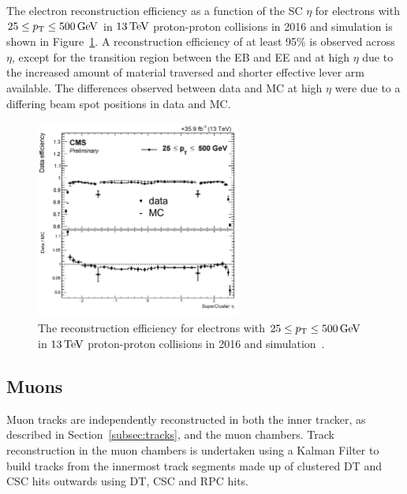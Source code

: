 The electron reconstruction efficiency as a function of the SC $\eta$ for electrons with $25 \leq p_{\mathrm{T}} \leq 500\,\text{Ge\hspace{-.08em}V}$ in $13\,\text{Te\hspace{-.08em}V}$ proton-proton collisions in 2016 and simulation is shown in Figure~\ref{fig:electronRecoEff}.
A reconstruction efficiency of at least 95\% is observed across $\eta$, except for the transition region between the EB and EE and at high $\eta$ due to the increased amount of material traversed and shorter effective lever arm available.
The differences observed between data and MC at high $\eta$ were due to a differing beam spot positions in data and MC.

\begin{figure}[htbp]
\centering
\includegraphics[width=0.6\textwidth]{figs/data-mc/electronGsfRecoEff.pdf}
\caption{The reconstruction efficiency for electrons with $25 \leq p_{\mathrm{T}} \leq 500\,\text{Ge\hspace{-.08em}V}$ in $13\,\text{Te\hspace{-.08em}V}$ proton-proton collisions in 2016 and simulation~\cite{CMS-DP-2017-004}.}
\label{fig:electronRecoEff}
\end{figure}

\subsection{Muons}\label{subsec:objReco-muons}
Muon tracks are independently reconstructed in both the inner tracker, as described in Section~\ref{subsec:tracks}, and the muon chambers.
Track reconstruction in the muon chambers is undertaken using a Kalman Filter to build tracks from the innermost track segments made up of clustered DT and CSC hits outwards using DT, CSC and RPC hits.

